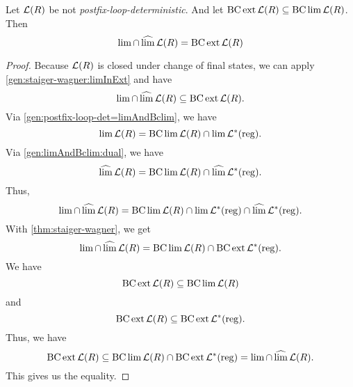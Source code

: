 %
%


\begin{mdframed}
\begin{theorem}
\label{gen:R-staiger-wagner}
Let $\Lang(R)$ be not \emph{postfix-loop-deterministic}. And let $\BC \ext \Lang(R) \subseteq \BC \lim \Lang(R)$. Then
\[ \lim \cap \dlim \Lang(R) = \BC \ext \Lang(R) \]
\end{theorem}
\end{mdframed}

\begin{proof}
Because $\Lang(R)$ is closed under change of final states, we can apply \cref{gen:staiger-wagner:limInExt} and have
\[ \lim \cap \dlim \Lang(R) \subseteq \BC \ext \Lang(R) .\]
Via \cref{gen:postfix-loop-det=limAndBclim}, we have
\[ \lim \Lang(R) = \BC \lim \Lang(R) \cap \lim \Langreg . \]
Via \cref{gen:limAndBclim:dual}, we have
\[ \dlim \Lang(R) = \BC \lim \Lang(R) \cap \dlim \Langreg . \]
Thus,
\[ \lim \cap \dlim \Lang(R) = \BC \lim \Lang(R) \cap \lim \Langreg \cap \dlim \Langreg . \]
With \cref{thm:staiger-wagner}, we get
\[ \lim \cap \dlim \Lang(R) = \BC \lim \Lang(R) \cap \BC \ext \Langreg . \]
We have
\[ \BC \ext \Lang(R) \subseteq \BC \lim \Lang(R) \]
and
\[ \BC \ext \Lang(R) \subseteq \BC \ext \Langreg . \]
Thus, we have
\[ \BC \ext \Lang(R) \subseteq \BC \lim \Lang(R) \cap \BC \ext \Langreg = \lim \cap \dlim \Lang(R). \]
This gives us the equality.
\end{proof}


